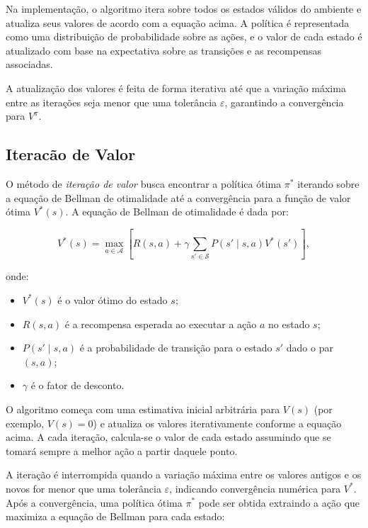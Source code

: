 \documentclass[a4paper,12pt]{article}
\begin{document}
Na implementação, o algoritmo itera sobre todos os estados válidos do ambiente e atualiza seus valores de acordo com a equação acima. A política é representada como uma distribuição de probabilidade sobre as ações, e o valor de cada estado é atualizado com base na expectativa sobre as transições e as recompensas associadas.

A atualização dos valores é feita de forma iterativa até que a variação máxima entre as iterações seja menor que uma tolerância $\varepsilon$, garantindo a convergência para $V^\pi$.



\newpage

\subsection{Iteracão de Valor}


O método de \textit{iteração de valor} busca encontrar a política ótima $\pi^*$ iterando sobre a equação de Bellman de otimalidade até a convergência para a função de valor ótima $V^*(s)$. A equação de Bellman de otimalidade é dada por:

\begin{equation}
V^*(s) = \max_{a \in \mathcal{A}} \left[ R(s, a) + \gamma \sum_{s' \in \mathcal{S}} P(s' \mid s, a) V^*(s') \right],
\end{equation}

onde:
\begin{itemize}
  \item $V^*(s)$ é o valor ótimo do estado $s$;
  \item $R(s, a)$ é a recompensa esperada ao executar a ação $a$ no estado $s$;
  \item $P(s' \mid s, a)$ é a probabilidade de transição para o estado $s'$ dado o par $(s, a)$;
  \item $\gamma$ é o fator de desconto.
\end{itemize}

O algoritmo começa com uma estimativa inicial arbitrária para $V(s)$ (por exemplo, $V(s) = 0$) e atualiza os valores iterativamente conforme a equação acima. A cada iteração, calcula-se o valor de cada estado assumindo que se tomará sempre a melhor ação a partir daquele ponto.

A iteração é interrompida quando a variação máxima entre os valores antigos e os novos for menor que uma tolerância $\varepsilon$, indicando convergência numérica para $V^*$. Após a convergência, uma política ótima $\pi^*$ pode ser obtida extraindo a ação que maximiza a equação de Bellman para cada estado:
\end{document}
